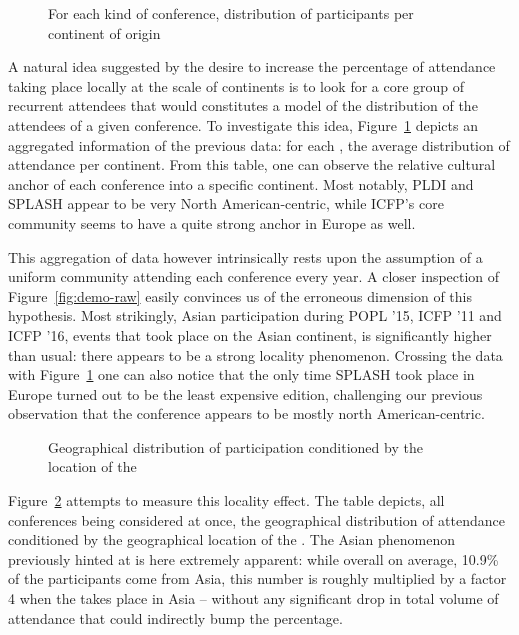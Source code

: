 \begin{figure}
\caption{For each kind of conference, distribution of participants per continent of origin}
\label{fig:demo-conf}
\end{figure}

A natural idea suggested by the desire to increase the percentage of attendance
taking place locally at the scale of continents is to look for a core group of
recurrent attendees that would constitutes a model of the distribution of the
attendees of a given conference. To investigate this idea, Figure~\ref{fig:demo-conf}
depicts an aggregated information of the previous data: for each 
\conf, the average distribution of attendance per continent. From this
table, one can observe the relative cultural anchor of each conference into a
specific continent. Most notably, PLDI and SPLASH appear to be very North
American-centric, while ICFP's core community seems to have a quite strong
anchor in Europe as well.

This aggregation of data however intrinsically rests upon the assumption of a uniform
community attending each conference every year. A closer inspection of
Figure~\ref{fig:demo-raw} easily convinces us of the erroneous dimension of this
hypothesis. Most strikingly, Asian participation during POPL '15, ICFP '11 and
ICFP '16, events that took place on the Asian continent, is significantly higher
than usual: there appears to be a strong locality phenomenon. Crossing the data with
Figure~\ref{fig:demo-conf} one can also notice that the only time SPLASH took
place in Europe turned out to be the least expensive edition, challenging our previous
observation that the conference appears to be mostly north American-centric.

\begin{figure}
\caption{Geographical distribution of participation conditioned by the location of the \event}
\label{fig:local_effect}
\end{figure}

Figure~\ref{fig:local_effect} attempts to measure this locality effect. The
table depicts, all conferences being considered at once, the geographical
distribution of attendance conditioned by the geographical location of the
\event. The Asian phenomenon previously hinted at is here extremely
apparent: while overall on average, 10.9\% of the participants come from Asia,
this number is roughly multiplied by a factor 4 when the \event takes place in Asia --
without any significant drop in total volume of attendance that could indirectly bump
the percentage.


